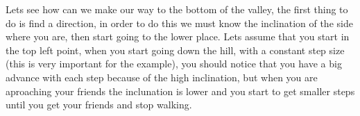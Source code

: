 \documentclass[12pt,journal]{IEEEtran}
\begin{document}
    \begin{figure}[h]
        \centering
    \end{figure}

    Lets see how can we make our way to the bottom of the valley, the first
    thing to do is find a direction, in order to do this we must know the
    inclination of the side where you are, then start going to the lower place.
    Lets assume that you start in the top left point, when you start going down
    the hill, with a constant step size (this is very important for the
    example), you should notice that you have a big advance with each step
    because of the high inclination, but when you are aproaching your friends
    the inclunation is lower and you start to get smaller steps until you get
    your friends and stop walking.

    \newpage
\end{document}
